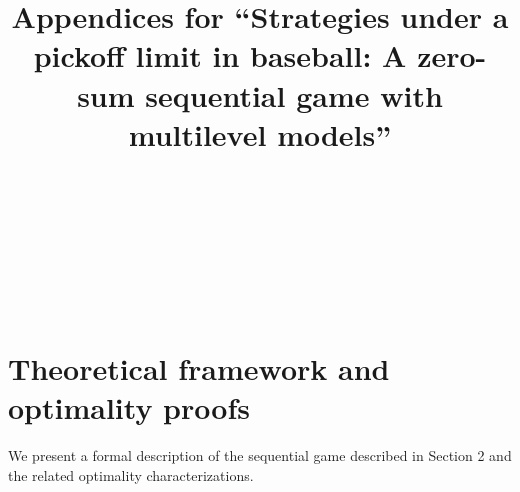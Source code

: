 \documentclass[aoas]{imsart}
\theoremstyle{plain}
\theoremstyle{definition}
\begin{document}
\begin{frontmatter}
\title{
  Appendices for ``Strategies under a pickoff limit in baseball: A zero-sum sequential game with multilevel models''
}

\begin{aug}
\author[A]{~}
\author[B]{~}
\author[A]{~}
\author[B]{~}
\address[A]{Department of Sport Management, Rice University}
\address[B]{Department of Computational Applied Mathematics and Operations Research, Rice University}
\end{aug}

\end{frontmatter}


\appendix

\section{Theoretical framework and optimality proofs}
    We present a formal description of the sequential game described in Section 2 and the related optimality characterizations.
    
\end{document}
